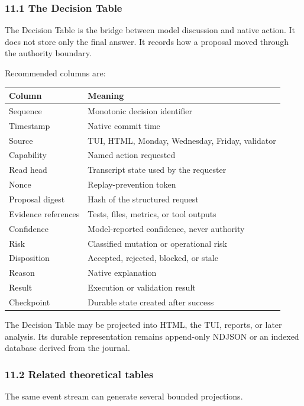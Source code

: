 \subsubsection{11.1 The Decision Table}

The Decision Table is the bridge between model discussion and native action. It
does not store only the final answer. It records how a proposal moved through
the authority boundary.

Recommended columns are:

{\def\LTcaptype{none} %
\begin{longtable}[]{@{}ll@{}}
\toprule\noalign{}
Column & Meaning \\
\midrule\noalign{}
\endhead
\bottomrule\noalign{}
\endlastfoot
Sequence & Monotonic decision identifier \\
Timestamp & Native commit time \\
Source & TUI, HTML, Monday, Wednesday, Friday, validator \\
Capability & Named action requested \\
Read head & Transcript state used by the requester \\
Nonce & Replay-prevention token \\
Proposal digest & Hash of the structured request \\
Evidence references & Tests, files, metrics, or tool outputs \\
Confidence & Model-reported confidence, never authority \\
Risk & Classified mutation or operational risk \\
Disposition & Accepted, rejected, blocked, or stale \\
Reason & Native explanation \\
Result & Execution or validation result \\
Checkpoint & Durable state created after success \\
\end{longtable}
}

The Decision Table may be projected into HTML, the TUI, reports, or later
analysis. Its durable representation remains append-only NDJSON or an indexed
database derived from the journal.

\subsubsection{11.2 Related theoretical tables}

The same event stream can generate several bounded projections.

